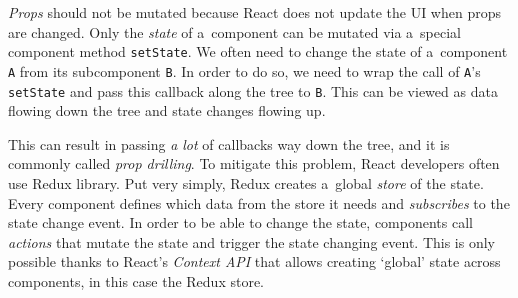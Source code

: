 \emph{Props} should not be mutated because React does not update the UI when props are changed. Only the \emph{state} of a~component can be mutated via a~special
component method \texttt{setState}. We often need to change the state of a~component \texttt{A} from its subcomponent \texttt{B}. In order to do so, we need to wrap
the call of \texttt{A}'s \texttt{setState} and pass this callback along the tree to \texttt{B}. This can be viewed as data flowing down the tree and state changes
flowing up.

This can result in passing \emph{a lot} of callbacks way down the tree, and it is commonly called \emph{prop drilling}. To mitigate this problem, React developers
often use Redux library. Put very simply, Redux creates a~global \emph{store} of the state. Every component defines which data from the store it needs and
\emph{subscribes} to the state change event. In order to be able to change the state, components call \emph{actions} that mutate the state and trigger the state
changing event. This is only possible thanks to React's \emph{Context API} that allows creating `global' state across components, in this case the Redux store.

